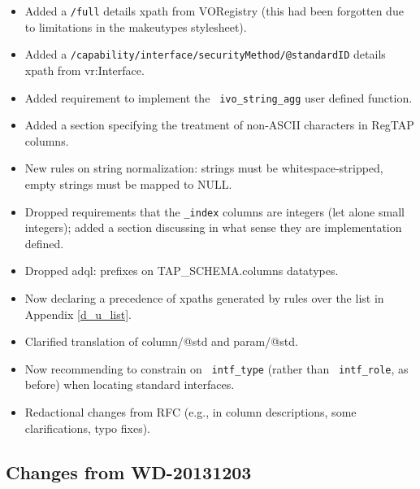 \documentclass[11pt,a4paper]{ivoa}
\newcommand{\rtent}[1]{\texttt{\color{rtcolor} #1}}
\begin{document}
\begin{itemize}

\item Added a \texttt{/full} details xpath from VORegistry (this had
  been forgotten due to limitations in the makeutypes stylesheet).{}

\item Added a \texttt{/capability/interface/securityMethod/@standardID}
  details xpath from vr:Interface.{}

\item Added requirement to implement the \rtent{ivo\_string\_agg}
  user defined function.{}

\item Added a section specifying the treatment of non-ASCII characters
  in RegTAP columns.{}

\item New rules on string normalization: strings must be
  whitespace-stripped, empty strings must be mapped to NULL.{}

\item Dropped requirements that the \texttt{\_index} columns are
  integers (let alone small integers); added a section discussing in
  what sense they are implementation defined.{}

\item Dropped adql: prefixes on TAP\_SCHEMA.columns datatypes.{}

\item Now declaring a precedence of xpaths generated by rules over the
  list in Appendix \ref{d_u_list}.{}

\item Clarified translation of column/@std and param/@std.{}

\item Now recommending to constrain on \rtent{intf\_type}
  (rather than \rtent{intf\_role}, as before) when locating standard
  interfaces.{}

\item Redactional changes from RFC (e.g., in column descriptions, some 
  clarifications, typo fixes).{}

\end{itemize}



\subsection{Changes from
WD-20131203}
\end{document}
